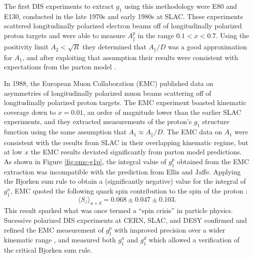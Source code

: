 The first DIS experiments to extract $g_1$ using this methodology were E80 and
E130, conducted in the late 1970s and early 1980s at SLAC. These experiments
scattered longitudinally polarized electron beams off of longitudinally
polarized proton targets and were able to measure $A_{\parallel}^p$ in the
range $0.1 < x < 0.7$. Using the positivity limit $A_2 < \sqrt{R}$ they
determined that $A_{\parallel}/D$ was a good approximation for $A_1$, and
after exploiting that assumption their results were consistent with
expectations from the parton model \cite{Alguard:1976bm, Baum:1983ha}.

In 1988, the European Muon Collaboration (EMC) published data on asymmetries
of longitudinally polarized muon beams scattering off of longitudinally
polarized proton targets. The EMC experiment boasted kinematic coverage down
to $x = 0.01$, an order of magnitude lower than the earlier SLAC experiments,
and they extracted measurements of the proton's $g_1$ structure function using
the same assumption that $A_1 \approx A_{\parallel}/D$. The EMC data on $A_1$
were consistent with the results from SLAC in their overlapping kinematic
regime, but at low $x$ the EMC results deviated significantly from parton
model predictions. As shown in Figure \ref{fig:emc-g1p}, the integral value of
$g_1^p$ obtained from the EMC extraction was incompatible with the prediction
from Ellis and Jaffe. Applying the Bjorken sum rule to obtain a (significantly
negative) value for the integral of $g_1^n$, EMC quoted the following quark
spin contribution to the spin of the proton \cite{Ashman:1987hv}: %
%
\begin{equation}
  \langle S_z \rangle_{u+d} = 0.068 \pm 0.047 \pm 0.103.
\end{equation}
%
This result sparked what was once termed a ``spin crisis'' in particle
physics. Sucessive polarized DIS experiments at CERN, SLAC, and DESY confirmed
and refined the EMC measurement of $g_1^p$ with improved precision over a
wider kinematic range \cite{Adams:1994zd}, and measured both $g_1^n$
\cite{Anthony:1993uf} and $g_1^d$ \cite{Adeva:1993km} which allowed a
verification of the critical Bjorken sum rule.

